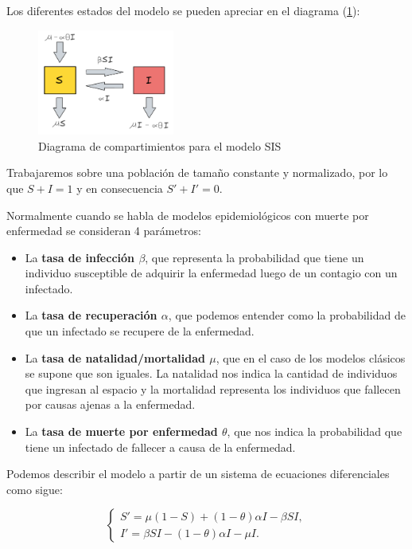 Los diferentes estados del modelo se pueden apreciar en el diagrama (\ref{fig:diagrama SIS}):

\begin{figure}[h]
  \centering
    \includegraphics[width=0.4\textwidth]{Imagenes/SIS_compartimientos.PNG}
  \caption{Diagrama de compartimientos para el modelo SIS}
  \label{fig:diagrama SIS}
\end{figure}

Trabajaremos sobre una población de tamaño constante y normalizado, por lo que $S + I = 1$ y en consecuencia $S' + I' = 0$.

Normalmente cuando se habla de modelos epidemiológicos con muerte por enfermedad se consideran 4 parámetros: 

\begin{itemize}
    \item La \textbf{tasa de infección $\beta$}, que representa la probabilidad que tiene un individuo susceptible de adquirir la enfermedad luego de un contagio con un infectado.
    \item La \textbf{tasa de recuperación $\alpha$}, que podemos entender como la probabilidad de que un infectado se recupere de la enfermedad.
    \item La \textbf{tasa de natalidad/mortalidad $\mu$}, que en el caso de los modelos clásicos se supone que son iguales. La natalidad nos indica la cantidad de individuos que ingresan al espacio y la mortalidad representa los individuos que fallecen por causas ajenas a la enfermedad.
    \item La \textbf{tasa de muerte por enfermedad $\theta$}, que nos indica la probabilidad que tiene un infectado de fallecer a causa de la enfermedad.
\end{itemize}

Podemos describir el modelo a partir de un sistema de ecuaciones diferenciales como sigue:

\begin{equation}\label{eq:Modelo SIS}
\left\{
\begin{array}{l}
S' = \mu(1 - S) + (1 - \theta)\alpha I - \beta S I, \\
I' = \beta S I - (1 - \theta)\alpha I - \mu I.
\end{array}
\right.
\end{equation}


